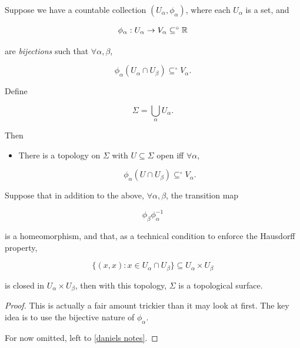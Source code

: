 \documentclass[11pt]{scrartcl}
\begin{document}
\begin{proposition}

Suppose we have a countable collection $(U_\alpha, \phi_\alpha)$, where each $U_\alpha$ is a set, and

\begin{equation}
    \phi_\alpha : U_\alpha \rightarrow V_\alpha \subseteq^\circ \mathbb R
\end{equation}

are \emph{bijections} such that $\forall \alpha, \beta$,

\begin{equation}
    \phi_\alpha(U_\alpha \cap U_\beta) \subseteq^\circ V_\alpha.
\end{equation}

Define

\begin{equation}
    \Sigma = \bigcup_\alpha U_\alpha.
\end{equation}

Then 

\begin{itemize}
    \item There is a topology on $\Sigma$ with $U \subseteq \Sigma$ open iff $\forall \alpha$, 
    
    \begin{equation}
        \phi_\alpha(U \cap U_\beta) \subseteq^\circ V_\alpha.
    \end{equation}
\end{itemize}

Suppose that in addition to the above, $\forall \alpha, \beta$, the transition map 

\begin{equation}
    \phi_\beta \phi_\alpha^{-1}
\end{equation}

is a homeomorphism, and that, as a technical condition to enforce the Hausdorff property,

\begin{equation}
    \{ (x,x) : x \in U_\alpha \cap U_\beta \} \subseteq U_\alpha \times U_\beta 
\end{equation}

is closed in $U_\alpha \times U_\beta$, then with this topology, $\Sigma$ is a topological surface.

\begin{proof}
    This is actually a fair amount trickier than it may look at first. The key idea is to use the bijective nature of $\phi_\alpha$.

    For now omitted, left to \ref{daniels notes}.
\end{proof}


\label{daniel topology}
\end{proposition}
\end{document}
